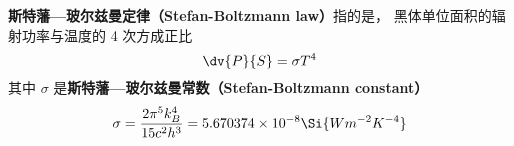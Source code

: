 
\textbf{斯特藩—玻尔兹曼定律（Stefan-Boltzmann law）}指的是， 黑体单位面积的辐射功率与温度的 4 次方成正比
\begin{equation}
\dv{P}{S} = \sigma T^4
\end{equation}
其中 $\sigma$ 是\textbf{斯特藩—玻尔兹曼常数（Stefan-Boltzmann constant）}
\begin{equation}
\sigma = \frac{2\pi^5k_B^4}{15c^2h^3} = 5.670374 \times 10^{-8} \Si{Wm^{-2}K^{-4}}
\end{equation}
